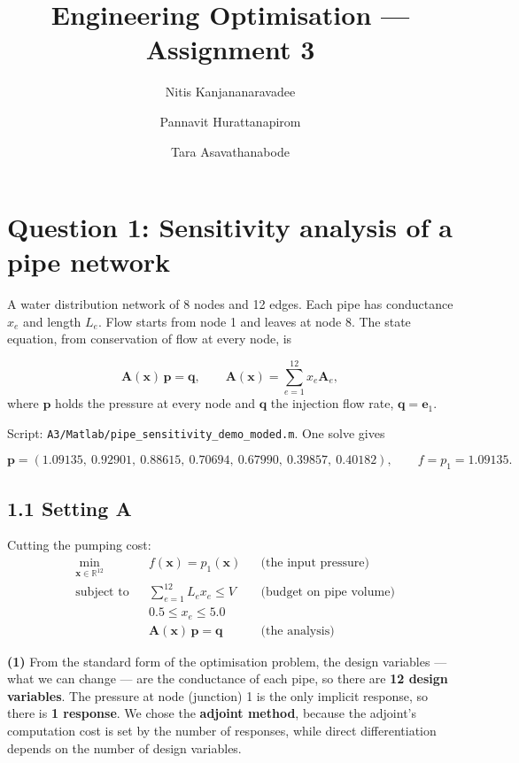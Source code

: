 \documentclass[11pt,a4paper]{article}
\title{Engineering Optimisation --- Assignment 3}
\author{Nitis Kanjananaravadee \and Pannavit Hurattanapirom \and Tara Asavathanabode}
\date{}
\begin{document}
\maketitle

\section*{Question 1: Sensitivity analysis of a pipe network}

\begin{sloppypar}
A water distribution network of 8 nodes and 12 edges. Each pipe has conductance
$x_e$ and length $L_e$. Flow starts from node 1 and leaves at node 8. The state
equation, from conservation of flow at every node, is
\end{sloppypar}
\[
  \bm{A}(\bm{x})\,\bm{p} = \bm{q},
  \qquad
  \bm{A}(\bm{x}) = \sum_{e=1}^{12} x_e \bm{A}_e,
\]
where $\bm{p}$ holds the pressure at every node and $\bm{q}$ the injection flow
rate, $\bm{q} = \bm{e}_1$.
\begin{sloppypar}
Script: \texttt{A3/Matlab/pipe\_sensitivity\_demo\_moded.m}. One solve gives
\end{sloppypar}
\[
  \bm{p} = (1.09135,\ 0.92901,\ 0.88615,\ 0.70694,\ 0.67990,\ 0.39857,\ 0.40182),
  \qquad f = p_1 = 1.09135 .
\]

\subsection*{1.1 Setting A}

Cutting the pumping cost:
\[
  \begin{aligned}
    &\min_{\bm{x}\in\mathbb{R}^{12}} && f(\bm{x}) = p_1(\bm{x})
      && \text{(the input pressure)}\\
    &\text{subject to} && \textstyle\sum_{e=1}^{12} L_e x_e \le V
      && \text{(budget on pipe volume)}\\
    & && 0.5 \le x_e \le 5.0 &&\\
    & && \bm{A}(\bm{x})\,\bm{p} = \bm{q} && \text{(the analysis)}
  \end{aligned}
\]

\textbf{(1)} From the standard form of the optimisation problem, the design
variables --- what we can change --- are the conductance of each pipe, so there
are \textbf{12 design variables}. The pressure at node (junction) 1 is the
only implicit response, so there is \textbf{1 response}. We chose the \textbf{adjoint method}, because the adjoint's
computation cost is set by the number of responses, while direct differentiation
depends on the number of design variables.
\end{document}

